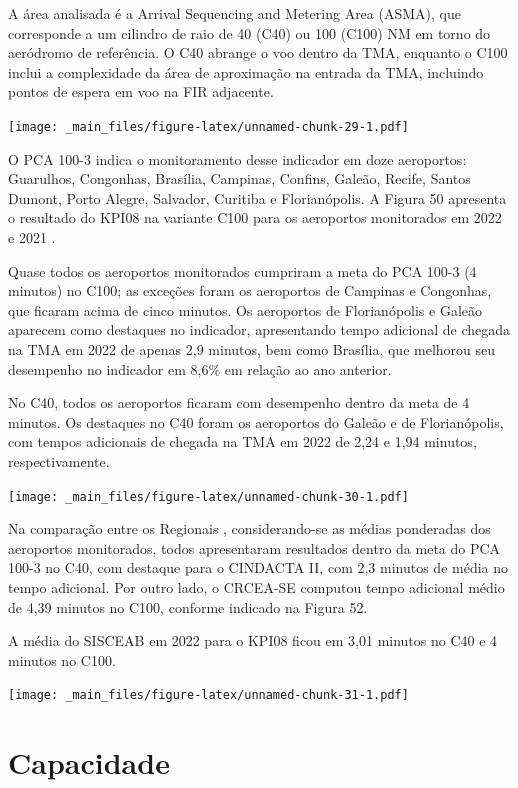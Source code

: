 \documentclass[
]{book}
\begin{document}
A área analisada é a Arrival Sequencing and Metering Area (ASMA), que corresponde a um cilindro de raio de 40 (C40) ou 100 (C100) NM em torno do aeródromo de referência. O C40 abrange o voo dentro da TMA, enquanto o C100 inclui a complexidade da área de aproximação na entrada da TMA, incluindo pontos de espera em voo na FIR adjacente.

\texttt{[image: \_main\_files/figure-latex/unnamed-chunk-29-1.pdf]}

O PCA 100-3 indica o monitoramento desse indicador em doze aeroportos: Guarulhos, Congonhas, Brasília, Campinas, Confins, Galeão, Recife, Santos Dumont, Porto Alegre, Salvador, Curitiba e Florianópolis. A Figura 50 apresenta o resultado do KPI08 na variante C100 para os aeroportos monitorados em 2022 e 2021 .

Quase todos os aeroportos monitorados cumpriram a meta do PCA 100-3 (4 minutos) no C100; as exceções foram os aeroportos de Campinas e Congonhas, que ficaram acima de cinco minutos. Os aeroportos de Florianópolis e Galeão aparecem como destaques no indicador, apresentando tempo adicional de chegada na TMA em 2022 de apenas 2,9 minutos, bem como Brasília, que melhorou seu desempenho no indicador em 8,6\% em relação ao ano anterior.

No C40, todos os aeroportos ficaram com desempenho dentro da meta de 4 minutos. Os destaques no C40 foram os aeroportos do Galeão e de Florianópolis, com tempos adicionais de chegada na TMA em 2022 de 2,24 e 1,94 minutos, respectivamente.

\texttt{[image: \_main\_files/figure-latex/unnamed-chunk-30-1.pdf]}

Na comparação entre os Regionais , considerando-se as médias ponderadas dos aeroportos monitorados, todos apresentaram resultados dentro da meta do PCA 100-3 no C40, com destaque para o CINDACTA II, com 2,3 minutos de média no tempo adicional. Por outro lado, o CRCEA-SE computou tempo adicional médio de 4,39 minutos no C100, conforme indicado na Figura 52.

A média do SISCEAB em 2022 para o KPI08 ficou em 3,01 minutos no C40 e 4 minutos no C100.

\texttt{[image: \_main\_files/figure-latex/unnamed-chunk-31-1.pdf]}

\hypertarget{capacidade}{%
\section{Capacidade}\label{capacidade}}
\end{document}
